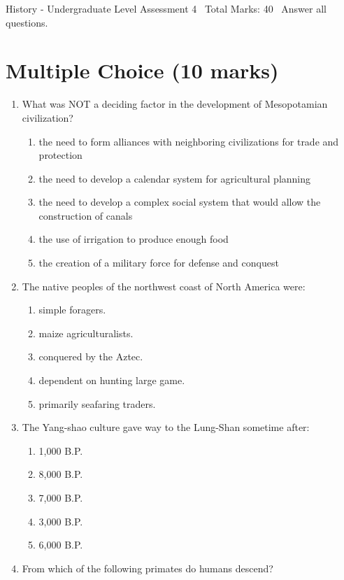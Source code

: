 \documentclass[12pt]{article}
\begin{document}
\begin{center}
History - Undergraduate Level Assessment 4 \
Total Marks: 40 \
Answer all questions.
\end{center}

\section*{Multiple Choice (10 marks)}
\begin{enumerate}[label=\arabic*.]
\item What was NOT a deciding factor in the development of Mesopotamian civilization?
\begin{enumerate}[label=(\alph*)]
    \item the need to form alliances with neighboring civilizations for trade and protection
    \item the need to develop a calendar system for agricultural planning
    \item the need to develop a complex social system that would allow the construction of canals
    \item the use of irrigation to produce enough food
    \item the creation of a military force for defense and conquest
\end{enumerate}
\item The native peoples of the northwest coast of North America were:
\begin{enumerate}[label=(\alph*)]
    \item simple foragers.
    \item maize agriculturalists.
    \item conquered by the Aztec.
    \item dependent on hunting large game.
    \item primarily seafaring traders.
\end{enumerate}
\item The Yang-shao culture gave way to the Lung-Shan sometime after:
\begin{enumerate}[label=(\alph*)]
    \item 1,000 B.P.
    \item 8,000 B.P.
    \item 7,000 B.P.
    \item 3,000 B.P.
    \item 6,000 B.P.
\end{enumerate}
\item From which of the following primates do humans descend?

\end{enumerate}
\end{document}
